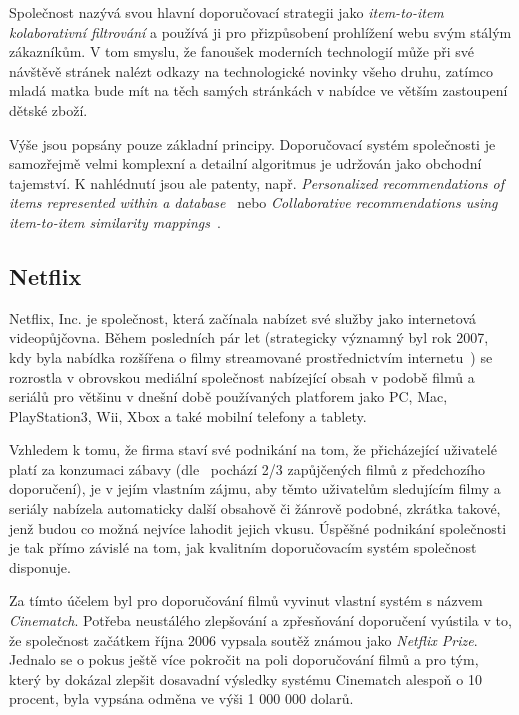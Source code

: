 \documentclass[thesis=M,czech]{FITthesis}[2014/05/07]
\begin{document}
Společnost nazývá svou hlavní doporučovací strategii jako \emph{item-to-item kolaborativní filtrování} a používá ji pro přizpůsobení prohlížení webu svým stálým zákazníkům. V tom smyslu, že fanoušek moderních technologií může při své návštěvě stránek nalézt odkazy na technologické novinky všeho druhu, zatímco mladá matka bude mít na těch samých stránkách v nabídce ve větším zastoupení dětské zboží.
 
Výše jsou popsány pouze základní principy. Doporučovací systém společnosti je samozřejmě velmi komplexní a detailní algoritmus je udržován jako obchodní tajemství. K nahlédnutí jsou ale patenty, např. \emph{Personalized recommendations of items represented within a database}~\cite{jacobi2006personalized} nebo \emph{Collaborative recommendations using item-to-item similarity mappings}~\cite{linden2001collaborative}.

\subsection{Netflix}

Netflix, Inc. je společnost, která začínala nabízet své služby jako internetová videopůjčovna. Během posledních pár let (strategicky významný byl rok 2007, kdy byla nabídka rozšířena o filmy streamované prostřednictvím internetu~\cite{netflix2007}) se rozrostla v obrovskou mediální společnost nabízející obsah v podobě filmů a seriálů pro většinu v dnešní době používaných platforem jako PC, Mac, PlayStation3, Wii, Xbox a také mobilní telefony a tablety. 

Vzhledem k tomu, že firma staví své podnikání na tom, že přicházející uživatelé platí za konzumaci zábavy (dle~\cite{netflixrec} pochází 2/3 zapůjčených filmů z předchozího doporučení), je v jejím vlastním zájmu, aby těmto uživatelům sledujícím filmy a seriály nabízela automaticky další obsahově či žánrově podobné, zkrátka takové, jenž budou co možná nejvíce lahodit jejich vkusu. Úspěšné podnikání společnosti je tak přímo závislé na tom, jak kvalitním doporučovacím systém společnost disponuje. 

Za tímto účelem byl pro doporučování filmů vyvinut vlastní systém s názvem \emph{Cinematch}. Potřeba neustálého zlepšování a zpřesňování doporučení vyústila v to, že společnost začátkem října 2006 vypsala soutěž známou jako \emph{Netflix Prize}. Jednalo se o pokus ještě více pokročit na poli doporučování filmů a pro tým, který by dokázal zlepšit dosavadní výsledky systému Cinematch alespoň o 10 procent, byla vypsána odměna ve výši 1 000 000 dolarů.
\end{document}
